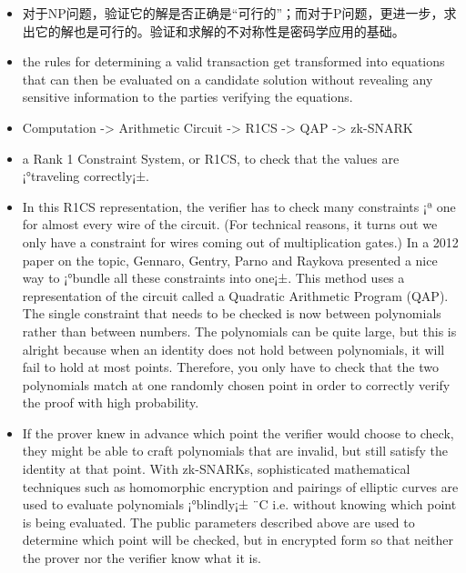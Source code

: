 \documentclass[11pt]{article}
\begin{document}
\begin{itemize}
\item 对于NP问题，验证它的解是否正确是“可行的”；而对于P问题，更进一步，求出它的解也是可行的。验证和求解的不对称性是密码学应用的基础。
\item the rules for determining a valid transaction get transformed into equations that can then be evaluated on a candidate solution without revealing any sensitive information to the parties verifying the equations.
\item Computation -> Arithmetic Circuit -> R1CS -> QAP -> zk-SNARK
\item a Rank 1 Constraint System, or R1CS, to check that the values are ¡°traveling correctly¡±.
\item In this R1CS representation, the verifier has to check many constraints ¡ª one for almost every wire of the circuit. (For technical reasons, it turns out we only have a constraint for wires coming out of multiplication gates.) In a 2012 paper on the topic, Gennaro, Gentry, Parno and Raykova presented a nice way to ¡°bundle all these constraints into one¡±. This method uses a representation of the circuit called a Quadratic Arithmetic Program (QAP). The single constraint that needs to be checked is now between polynomials rather than between numbers. The polynomials can be quite large, but this is alright because when an identity does not hold between polynomials, it will fail to hold at most points. Therefore, you only have to check that the two polynomials match at one randomly chosen point in order to correctly verify the proof with high probability.
\item If the prover knew in advance which point the verifier would choose to check, they might be able to craft polynomials that are invalid, but still satisfy the identity at that point. With zk-SNARKs, sophisticated mathematical techniques such as homomorphic encryption and pairings of elliptic curves are used to evaluate polynomials ¡°blindly¡± ¨C i.e. without knowing which point is being evaluated. The public parameters described above are used to determine which point will be checked, but in encrypted form so that neither the prover nor the verifier know what it is.
\end{itemize}
\end{document}
